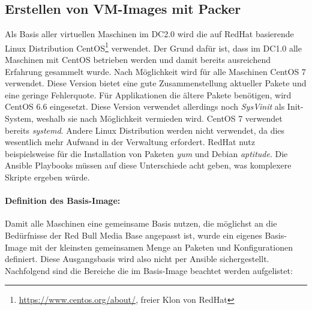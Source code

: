 \subsection{Erstellen von VM-Images mit Packer}
Als Basis aller virtuellen Maschinen im DC2.0 wird die auf RedHat basierende Linux Distribution CentOS\footnote{\url{https://www.centos.org/about/}, freier Klon von RedHat} verwendet. Der Grund dafür ist, dass im DC1.0 alle Maschinen mit CentOS betrieben werden und damit bereits ausreichend Erfahrung gesammelt wurde. Nach Möglichkeit wird für alle Maschinen CentOS 7 verwendet. Diese Version bietet eine gute Zusammenstellung aktueller Pakete und eine geringe Fehlerquote. Für Applikationen die ältere Pakete benötigen, wird CentOS 6.6 eingesetzt. Diese Version verwendet allerdings noch \textit{SysVinit} als Init-System, weshalb sie nach Möglichkeit vermieden wird. CentOS 7 verwendet bereits \textit{systemd}. Andere Linux Distribution werden nicht verwendet, da dies wesentlich mehr Aufwand in der Verwaltung erfordert. RedHat nutz beispielsweise für die Installation von Paketen \textit{yum} und Debian \textit{aptitude}. Die Ansible Playbooks müssen auf diese Unterschiede acht geben, was komplexere Skripte ergeben würde.

\paragraph{Definition des Basis-Image:}
Damit alle Maschinen eine gemeinsame Basis nutzen, die möglichst an die Bedürfnisse der Red Bull Media Base angepasst ist, wurde ein eigenes Basis-Image mit der kleinsten gemeinsamen Menge an Paketen und Konfigurationen definiert. Diese Ausgangsbasis wird also nicht per Ansible sichergestellt. Nachfolgend sind die Bereiche die im Basis-Image beachtet werden aufgelistet:

